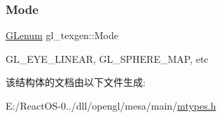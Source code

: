 \subsubsection{\texorpdfstring{Mode}{Mode}}
{\footnotesize\ttfamily \hyperlink{interfacevoid}{G\+Lenum} gl\+\_\+texgen\+::\+Mode}

G\+L\+\_\+\+E\+Y\+E\+\_\+\+L\+I\+N\+E\+AR, G\+L\+\_\+\+S\+P\+H\+E\+R\+E\+\_\+\+M\+AP, etc 

该结构体的文档由以下文件生成\+:\begin{DoxyCompactItemize}
\item 
E\+:/\+React\+O\+S-\/0../dll/opengl/mesa/main/\hyperlink{mtypes_8h}{mtypes.\+h}\end{DoxyCompactItemize}
